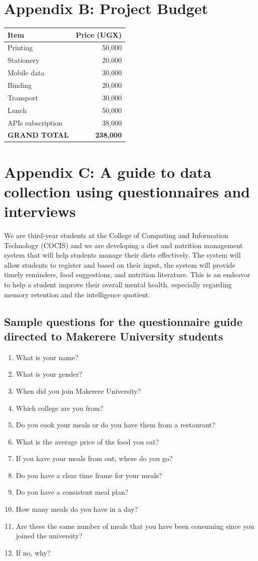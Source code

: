 \documentclass{article}
\begin{document}
\newpage
\section{Appendix B: Project Budget}
\begin{tabular}{|l|r|}
\hline
\textbf{Item} & \textbf{Price (UGX)} \\ \hline
Printing & 50,000 \\ \hline
Stationery & 20,000 \\ \hline
Mobile data & 30,000 \\ \hline
Binding & 20,000 \\ \hline
Transport & 30,000 \\ \hline
Lunch & 50,000 \\ \hline
APIs subscription & 38,000 \\ \hline
\textbf{GRAND TOTAL} & \textbf{238,000} \\ \hline
\end{tabular}

\newpage
\section{Appendix C: A guide to data collection using questionnaires and interviews}

We are third-year students at the College of Computing and Information Technology (COCIS) and we are developing a diet and nutrition management system that will help students manage their diets effectively. The system will allow students to register and based on their input, the system will provide timely reminders, food suggestions, and nutrition literature. This is an endeavor to help a student improve their overall mental health, especially regarding memory retention and the intelligence quotient.

\subsection{Sample questions for the questionnaire guide directed to Makerere University students}
\begin{enumerate}
\item What is your name?
\item What is your gender?
\item When did you join Makerere University?
\item Which college are you from?
\item Do you cook your meals or do you have them from a restaurant?
\item What is the average price of the food you eat?
\item If you have your meals from out, where do you go?
\item Do you have a clear time frame for your meals?
\item Do you have a consistent meal plan?
\item How many meals do you have in a day?
\item Are these the same number of meals that you have been consuming since you joined the university?
\item If no, why?
\end{enumerate}
\end{document}
